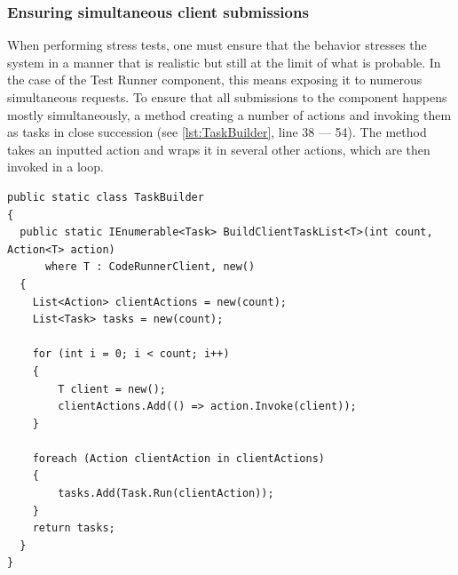 \subsubsection{Ensuring simultaneous client submissions}
When performing stress tests, one must ensure that the behavior stresses the system in a manner that is realistic but still at the limit of what is probable.
In the case of the Test Runner component, this means exposing it to numerous simultaneous requests. 
To ensure that all submissions to the component happens mostly simultaneously, a method creating a number of actions and invoking them as tasks in close succession (see \ref{lst:TaskBuilder}, line 38 --- 54).  
The method takes an inputted action and wraps it in several other actions, which are then invoked in a loop. 

\begin{lstlisting}[language=CSharp, escapechar=~, caption={C\# code showing the \texttt{BuildClientTaskList} method, which is used to build a number of actions which are executed simultaneously in a Task}, label={lst:TaskBuilder}]
public static class TaskBuilder
{
  public static IEnumerable<Task> BuildClientTaskList<T>(int count, Action<T> action)
      where T : CodeRunnerClient, new()
  {
    List<Action> clientActions = new(count);
    List<Task> tasks = new(count);
    
    for (int i = 0; i < count; i++)
    {
        T client = new();
        clientActions.Add(() => action.Invoke(client));
    }

    foreach (Action clientAction in clientActions)
    {
        tasks.Add(Task.Run(clientAction));
    }
    return tasks;
  }
}
\end{lstlisting}

